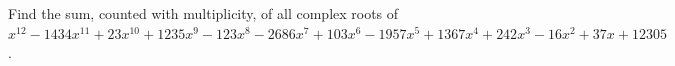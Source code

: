 Find the sum, counted with multiplicity, of all complex roots of $x^{12}-1434x^{11}+23x^{10}+1235x^9-123x^8-2686x^7+103x^6-1957x^5+1367x^4+242x^3-16x^2+37x+12305$.
